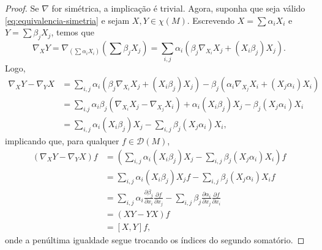 \begin{proposition}
\begin{proof}
		Se $\nabla$ for simétrica, a implicação é trivial. Agora, suponha que seja válido \eqref{eq:equivalencia-simetria} e sejam $X,Y \in \chi(M)$. Escrevendo $X=\sum\alpha_{i}X_{i}$ e $Y=\sum\beta_{j}X_{j}$, temos que
		\begin{equation*}
			\nabla _{X}Y=\nabla_{\left( \sum\alpha_{i}X_{i} \right)}\left( \sum \beta_{j}X_{j} \right)=\sum_{i,j}\alpha_{i}(\beta_{j}\nabla_{X_{i}}X_{j}+(X_{i}\beta_{j})X_{j}).
		\end{equation*}
		Logo,
		\begin{align*}
			\nabla_{X}Y-\nabla_{Y}X & =\sum_{i,j}\alpha _{i}(\beta_{j}\nabla_{X_{i}}X_{j}+(X_{i}\beta_{j})X_{j})-\beta_{j}(\alpha_{i}\nabla_{X_{j}}X_{i}+(X_{j}\alpha_{i})X_{i}) \\
			                        & = \sum_{i.j}\alpha_{i}\beta_{j}(\nabla_{X_{i}}X_{j}-\nabla_{X_{j}}X_{i})+\alpha_{i}(X_{i}\beta_{j})X_{j}-\beta_{j}(X_{j}\alpha_{i})X_{i}   \\
			                        & = \sum_{i,j}\alpha_{i}(X_{i}\beta_{j})X_{j}- \sum_{i,j}\beta_{j}(X_{j}\alpha_{i})X_{i},
		\end{align*}
		implicando que, para qualquer $f \in \mathcal{D}(M)$,
		\begin{align*}
			(\nabla_{X}Y-\nabla_{Y}X)f & =\left( \sum_{i,j}\alpha_{i}(X_{i}\beta_{j})X_{j}- \sum_{i,j}\beta_{j}(X_{j}\alpha_{i})X_{i} \right)f                                                                                          \\
			                           & = \sum_{i,j}\alpha_{i}(X_{i}\beta_{j})X_{j}f- \sum_{i,j}\beta_{j}(X_{j}\alpha_{i})X_{i}f                                                                                                       \\
			                           & =\sum_{i,j}\alpha_{i}\frac{\partial\beta_{j}}{\partial x_{i}}\frac{\partial f}{\partial x_{j}} - \sum_{i,j}\beta_{j}\frac{\partial\alpha_{i}}{\partial x_{j}}\frac{\partial f}{\partial x_{i}} \\
			                           & = (XY-YX)f                                                                                                                                                                                     \\
			                           & = [X,Y]f,
		\end{align*}
		onde a penúltima igualdade segue trocando os índices do segundo somatório.
	\end{proof}
\end{proposition}

